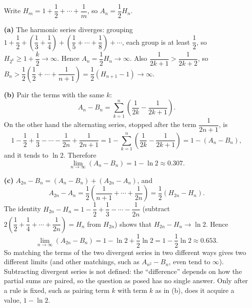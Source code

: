 Write $H_m=1+\dfrac{1}{2}+\cdots+\dfrac{1}{m}$, so $A_n=\dfrac{1}{2}H_n$.

\textbf{(a)} The harmonic series diverges: grouping $1+\dfrac{1}{2}+\left(\dfrac{1}{3}+\dfrac{1}{4}\right)+\left(\dfrac{1}{5}+\cdots+\dfrac{1}{8}\right)+\cdots$, each group is at least $\dfrac{1}{2}$, so $H_{2^k}\ge1+\dfrac {k}{2}\to\infty$. Hence $A_n=\dfrac{1}{2}H_n\to\infty$. Also $\dfrac{1}{2k+1}>\dfrac{1}{2k+2}$, so $B_n>\dfrac{1}{2}\left(\dfrac{1}{2}+\cdots+\dfrac{1}{n+1}\right)=\dfrac{1}{2}\left(H_{n+1}-1\right)\to\infty$.

\textbf{(b)} Pair the terms with the same $k$:
\[
A_n-B_n=\sum_{k=1}^{n}\left(\dfrac{1}{2k}-\dfrac{1}{2k+1}\right).
\]
On the other hand the alternating series, stopped after the term $\dfrac{1}{2n+1}$, is
\[
1-\dfrac{1}{2}+\dfrac{1}{3}-\cdots-\dfrac{1}{2n}+\dfrac{1}{2n+1}=1-\sum_{k=1}^{n}\left(\dfrac{1}{2k}-\dfrac{1}{2k+1}\right)=1-(A_n-B_n),
\]
and it tends to $\ln2$. Therefore
\[
\lim_{n\to\infty}(A_n-B_n)=\boxed{1-\ln2}\approx0.307 .
\]

\textbf{(c)} $A_{2n}-B_n=(A_n-B_n)+(A_{2n}-A_n)$, and
\[
A_{2n}-A_n=\dfrac{1}{2}\left(\dfrac{1}{n+1}+\cdots+\dfrac{1}{2n}\right)=\dfrac{1}{2}\left(H_{2n}-H_n\right).
\]
The identity $H_{2n}-H_n=1-\dfrac{1}{2}+\dfrac{1}{3}-\cdots-\dfrac{1}{2n}$ (subtract $2\left(\dfrac{1}{2}+\dfrac{1}{4}+\cdots+\dfrac{1}{2n}\right)=H_n$ from $H_{2n}$) shows that $H_{2n}-H_n\to\ln2$. Hence
\[
\lim_{n\to\infty}(A_{2n}-B_n)=1-\ln2+\dfrac{1}{2}\ln2=1-\dfrac{1}{2}\ln2\approx0.653 .
\]
So matching the terms of the two divergent series in two different ways gives two different limits (and other matchings, such as $A_{n^2}-B_n$, even tend to $\infty$). Subtracting divergent series is not defined: the ``difference'' depends on how the partial sums are paired, so the question as posed has no single answer. Only after a rule is fixed, such as pairing term $k$ with term $k$ as in (b), does it acquire a value, $1-\ln2$.
